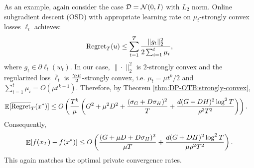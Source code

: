 \begin{remark}
As an example, again consider the case ${\cal D}={\cal N}(0,I)$ with $L_2$ norm. Online subgradient descent (OSD) with appropriate learning rate on $\mu_t$-strongly convex losses $\ell_t$ achieves:
\begin{align*}
    \mathrm{Regret}_T(u) \leq \sum_{t=1}^T \frac{\|g_t\|_2^2}{2\sum_{i=1}^t\mu_i},
\end{align*}
where $g_t\in \partial\ell_t(w_t)$. In our case, $\|\cdot\|_2^2$ is $2$-strongly convex and the regularized loss $\bar \ell_t$ is $\frac{\gamma_t\mu}{2}$-strongly convex, i.e. $\mu_t=\mu t^k/2$ and $\sum_{i=1}^t \mu_i = O(\mu t^{k+1})$. Therefore, by Theorem \ref{thm:DP-OTB:strongly-convex},
\begin{align*}
    \mathop{\mathbb{E}}[\overline{\mathrm{Regret}}_T(x^*)] 
    &\leq O\left( \frac{T^k}{\mu}\left( G^2+\mu^2D^2 + \frac{(\sigma_G+D\sigma_H)^2}{T} + \frac{d(G+DH)^2\log^2T}{\rho^2T^2}  \right) \right).
\end{align*}
Consequently,
\begin{align*}
    \mathop{\mathbb{E}}[f(x_T)- f(x^*)]
    \leq O\left(  \frac{(G+\mu D+D\sigma_H)^2}{\mu T} + \frac{d(G+DH)^2\log^2T}{\mu\rho^2T^2} \right).
\end{align*}
This again matches the optimal private convergence rates.
\end{remark}

